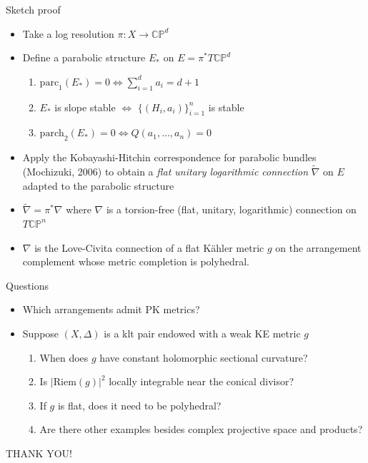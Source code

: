 \documentclass{beamer}
\newcommand{\CP}{\mathbb{CP}}
\begin{document}
\begin{frame}{Sketch proof}
	\begin{itemize}
		\item Take a log resolution \(\pi: X \to \CP^d\)
		\item Define a parabolic structure \(E_*\) on \(E = \pi^*T\CP^d\)
		\begin{enumerate}
			\item \(\mathrm{parc}_1(E_*) = 0 \iff \sum_{i=1}^{d} a_i = d+1\)
			\item \(E_*\) is slope stable \(\iff\) \(\{(H_i,a_i)\}_{i=1}^n\) is stable
			\item \(\mathrm{parch}_2(E_*) = 0 \iff Q(a_1, \ldots, a_n) = 0\)
		\end{enumerate}
		\item Apply the Kobayashi-Hitchin correspondence for parabolic bundles (Mochizuki, 2006) to obtain a \emph{flat unitary logarithmic connection} \(\widetilde{\nabla}\) on \(E\) adapted to the parabolic structure
		\item \(\widetilde{\nabla} = \pi^*\nabla\) where \(\nabla\) is a torsion-free (flat, unitary, logarithmic) connection on \(T\CP^n\)
		\item \(\nabla\) is the Love-Civita connection of a flat K\"ahler metric \(g\) on the arrangement complement whose metric completion is polyhedral.
	\end{itemize}
\end{frame}

\begin{frame}{Questions}
	\begin{itemize}
		\item Which arrangements admit PK metrics?
		\item Suppose \((X, \Delta)\) is a klt pair endowed with a weak KE metric \(g\)
		\begin{enumerate}
			\item When does \(g\) have constant holomorphic sectional curvature?
			\item Is \(|\mathrm{Riem}(g)|^2\) locally integrable near the conical divisor?
			\item If \(g\) is flat, does it need to be polyhedral?
			\item Are there other examples besides complex projective space and products?
		\end{enumerate}
	\end{itemize}
\end{frame}


\begin{frame}{}
	\centering
	\Huge{THANK YOU!}
\end{frame}
\end{document}
